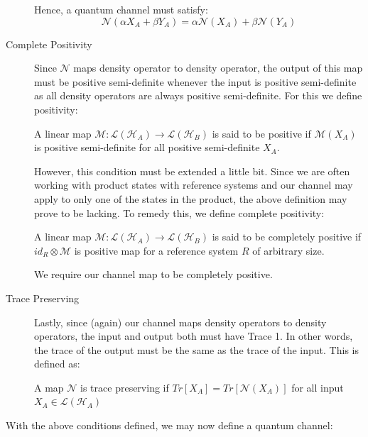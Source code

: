 \begin{description}
{        Hence, a quantum channel must satisfy:
        \begin{equation*}
            \mathcal{N}(\alpha X_A + \beta Y_A) = \alpha \mathcal{N}(X_A) + \beta \mathcal{N}(Y_A)
        \end{equation*}
        }
    \item[Complete Positivity] {
        Since $\mathcal{N}$ maps density operator to density operator, the output of this map must
        be positive semi-definite whenever the input is positive semi-definite as all density operators
        are always positive semi-definite. For this we define positivity:
        \begin{definition}[Positivity]
            A linear map $\mathcal{M} : \mathcal{L}(\mathcal{H}_A) \rightarrow \mathcal{L}(\mathcal{H}_B)$
            is said to be positive if $\mathcal{M}(X_A)$ is positive semi-definite for all positive
            semi-definite $X_A$.
        \end{definition}
        However, this condition must be extended a little bit. Since we are often working with product
        states with reference systems and our channel may apply to only one of the states in the product,
        the above definition may prove to be lacking. To remedy this, we define complete positivity:
        \begin{definition}
            A linear map $\mathcal{M} : \mathcal{L}(\mathcal{H}_A) \rightarrow \mathcal{L}(\mathcal{H}_B)$
            is said to be completely positive if $id_R \otimes \mathcal{M}$ is positive map for a reference
            system $R$ of arbitrary size.
        \end{definition}
        We require our channel map to be completely positive.
    }
    \item[Trace Preserving] {
        Lastly, since (again) our channel maps density operators to density operators, the input and output
        both must have Trace 1. In other words, the trace of the output must be the same as the trace of the
        input. This is defined as:
        \begin{definition}
            A map $\mathcal{N}$ is trace preserving if $Tr[X_A] = Tr[\mathcal{N}(X_A)]$ for all input $X_A \in \mathcal{L}(\mathcal{H}_A)$
        \end{definition}
    }
\end{description}

With the above conditions defined, we may now define a quantum channel:

